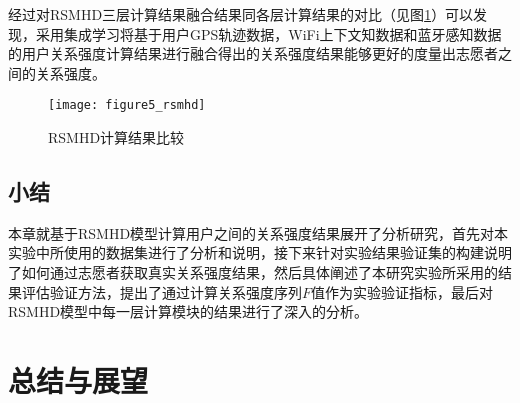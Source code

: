 \par 经过对RSMHD三层计算结果融合结果同各层计算结果的对比（见图\ref{fig:result_rsmhd}）可以发现，采用集成学习将基于用户GPS轨迹数据，WiFi上下文知数据和蓝牙感知数据的用户关系强度计算结果进行融合得出的关系强度结果能够更好的度量出志愿者之间的关系强度。
\begin{figure}[htb]
\centering
\texttt{[image: figure5\_rsmhd]}
\caption{RSMHD计算结果比较}
\label{fig:result_rsmhd}
\end{figure}

\section{小结}
\label{sec:section5-4}
本章就基于RSMHD模型计算用户之间的关系强度结果展开了分析研究，首先对本实验中所使用的数据集进行了分析和说明，接下来针对实验结果验证集的构建说明了如何通过志愿者获取真实关系强度结果，然后具体阐述了本研究实验所采用的结果评估验证方法，提出了通过计算关系强度序列$F$值作为实验验证指标，最后对RSMHD模型中每一层计算模块的结果进行了深入的分析。
\chapter{总结与展望}
\label{chap:chapter06}
